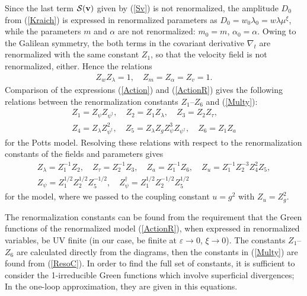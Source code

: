 \documentclass[12pt]{article}
\def\S{{\cal S}}
\def\bfv{{\bf v}}
\begin{document}
Since the last term $\S(\bfv)$ given by (\ref{Sv}) is not renormalized,
the amplitude $D_{0}$ from (\ref{Kraich}) is expressed in renormalized
parameters as $D_{0} = w_{0} \lambda_{0}  = w\lambda \mu^{\xi}$, while
the parameters $m$ and $\alpha$ are not renormalized: $m_{0} = m$,
$\alpha_{0} = \alpha$. Owing to the Galilean symmetry, the both terms
in the covariant derivative $\nabla_{t}$ are renormalized with the same
constant $Z_{1}$, so that the velocity field is not renormalized, either.
Hence the relations
\begin{eqnarray}
Z_{w}Z_{\lambda} =1, \quad Z_{m}= Z_{\alpha} = Z_{v} =1.
\label{RenD}
\end{eqnarray}
Comparison of the expressions (\ref{Action}) and
(\ref{ActionR}) gives the following relations between
the renormalization constants $Z_{1}$--$Z_{6}$ and (\ref{Multy}):
\begin{eqnarray}
Z_{1} = Z_{\psi} Z_{\psi^{\dagger}}, \quad Z_{2} = Z_{1}Z_{\lambda}, \quad
Z_{3} = Z_{2} Z_{\tau},\\ \nonumber Z_{4} = Z_{\lambda} Z_{\psi^{\dagger}}^{2}, \quad
Z_{5} = Z_{\lambda}Z_{g} Z_{\psi}^{3} Z_{\psi^{\dagger}}, \quad Z_{6} = Z_{1} Z_{a}
\label{ZZ}
\end{eqnarray}
for the Potts model.
Resolving these relations with respect to the renormalization constants
of the fields and parameters gives
\begin{eqnarray}
Z_{\lambda} = Z_{1}^{-1} Z_{2}, \quad Z_{\tau} = Z_{2}^{-1} Z_{3}, \quad
Z_{a} = Z_{1}^{-1} Z_{6}, \quad
Z_{u} = Z_{1}^{-1} Z_{2}^{-3} Z_{4}^{2} Z_{5}, \\ \nonumber 
Z_{\psi}= Z_{1}^{1/2}Z_{2}^{1/2}Z_{5}^{-1/2}, \quad
Z_{\psi}^{\dag}= Z_{1}^{1/2}Z_{2}^{-1/2}Z_{5}^{1/2}
\label{ResoC}
\end{eqnarray}
for the model, where we passed to the coupling
constant $u=g^{2}$ with $Z_{u}=Z_{g}^{2}$.


The renormalization constants can be found from the requirement that the
Green functions of the renormalized model
(\ref{ActionR}), when expressed in renormalized
variables, be UV finite (in our case, be finite at $\varepsilon\to0$,
$\xi\to0$). The constants $Z_{1}$--$Z_{6}$ are calculated directly from
the diagrams, then the constants in (\ref{Multy}) are found from
(\ref{ResoC}). In order to find the full set of constants,
it is sufficient to consider the 1-irreducible Green functions which involve
superficial divergences; In the one-loop approximation, they are given in this equations.
\end{document}
